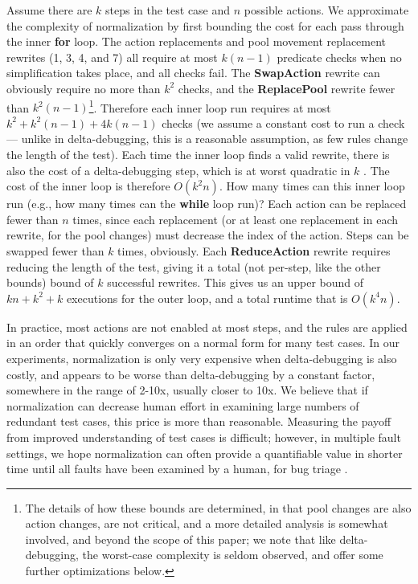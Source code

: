 Assume there are $k$ steps in the test case and $n$ possible actions.
We approximate the complexity of normalization by first bounding the cost for each pass through the
inner {\bf for} loop.  The action replacements and pool movement
replacement rewrites (1, 3, 4, and 7) all require at most $k (n-1)$
predicate checks when no simplification takes place, and all checks
fail.  The {\bf SwapAction} rewrite can obviously require no more than
$k^2$ checks, and the {\bf ReplacePool} rewrite fewer than
$k^2 (n-1)$\footnote{The details of how these bounds are determined,
  in that pool changes are also action changes, are not critical, and
  a more detailed analysis is somewhat involved, and beyond the scope
  of this paper; we note that like delta-debugging, the worst-case
  complexity is seldom observed, and offer some further optimizations
  below.}.  Therefore each inner loop run requires at most
$k^2 + k^2(n-1) + 4k(n-1)$ checks (we assume a constant cost to run a
check --- unlike in delta-debugging, this is a reasonable assumption, as few
rules change the length of the test).  Each time the inner loop finds
a valid rewrite, there is also the cost of a delta-debugging step,
which is at worst quadratic in $k$ \cite{DD}.  The cost of the inner
loop is therefore $O(k^2n)$.  How many times can this inner loop run
(e.g., how many times can the {\bf while} loop run)?  Each
action can be replaced fewer than $n$ times, since each
replacement (or at least one replacement in each rewrite,
for the pool changes) must decrease the index of the action.  Steps
can be swapped fewer than $k$ times, obviously.  Each  {\bf
  ReduceAction} rewrite requires reducing the length of the
test, giving it a total (not per-step, like the other bounds) bound of
$k$ successful rewrites.  This gives us an upper bound of $kn +
k^2 + k$ executions for the outer loop, and a total runtime that is
$O(k^4n)$.

In practice, most actions are not enabled at most steps, and
the rules are applied in an order that quickly converges on a normal
form for many test cases.  In our experiments, normalization is only
very expensive when delta-debugging is also costly, and appears to be
worse than delta-debugging by a constant factor, somewhere in the
range of 2-10x, usually closer to 10x.  We believe that if
normalization can decrease human effort in examining large numbers of
redundant test cases, this price is more than reasonable.  Measuring
the payoff from improved understanding of test cases is difficult;
however, in multiple fault settings, we hope normalization can often
provide a quantifiable value in shorter time until all faults have
been examined by a human, for bug triage \cite{PLDI13}.

